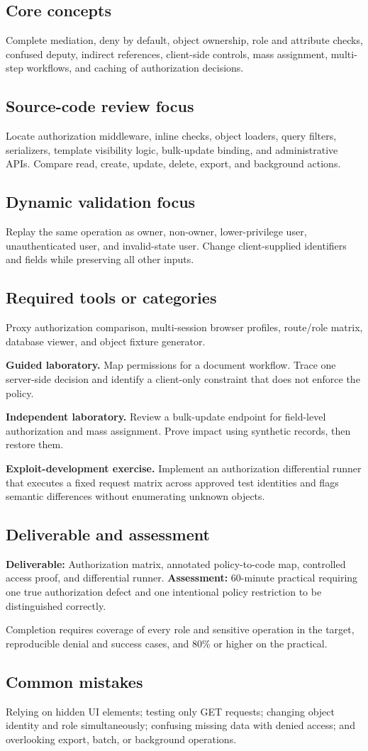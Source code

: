 \documentclass[11pt]{article}
\newcommand{\weekfield}[2]{%
  \Needspace{5\baselineskip}
  \subsection*{#1}
  #2
}
\newcommand{\deliverable}[1]{\textbf{Deliverable:} #1}
\newcommand{\assessment}[1]{\textbf{Assessment:} #1}
\begin{document}
\weekfield{Core concepts}{Complete mediation, deny by default, object ownership,
role and attribute checks, confused deputy, indirect references, client-side
controls, mass assignment, multi-step workflows, and caching of authorization
decisions.}

\weekfield{Source-code review focus}{Locate authorization middleware, inline
checks, object loaders, query filters, serializers, template visibility logic,
bulk-update binding, and administrative APIs. Compare read, create, update,
delete, export, and background actions.}

\weekfield{Dynamic validation focus}{Replay the same operation as owner,
non-owner, lower-privilege user, unauthenticated user, and invalid-state user.
Change client-supplied identifiers and fields while preserving all other inputs.}

\weekfield{Required tools or categories}{Proxy authorization comparison,
multi-session browser profiles, route/role matrix, database viewer, and object
fixture generator.}

\begin{labbox}
\textbf{Guided laboratory.} Map permissions for a document workflow. Trace one
server-side decision and identify a client-only constraint that does not enforce
the policy.

\textbf{Independent laboratory.} Review a bulk-update endpoint for field-level
authorization and mass assignment. Prove impact using synthetic records, then
restore them.

\textbf{Exploit-development exercise.} Implement an authorization differential
runner that executes a fixed request matrix across approved test identities and
flags semantic differences without enumerating unknown objects.
\end{labbox}

\weekfield{Deliverable and assessment}{\deliverable{Authorization matrix,
annotated policy-to-code map, controlled access proof, and differential runner.}
\assessment{60-minute practical requiring one true authorization defect and one
intentional policy restriction to be distinguished correctly.}}

\begin{checkpoints}
Completion requires coverage of every role and sensitive operation in the target,
reproducible denial and success cases, and 80\% or higher on the practical.
\end{checkpoints}

\weekfield{Common mistakes}{Relying on hidden UI elements; testing only GET
requests; changing object identity and role simultaneously; confusing missing
data with denied access; and overlooking export, batch, or background operations.}
\end{document}
